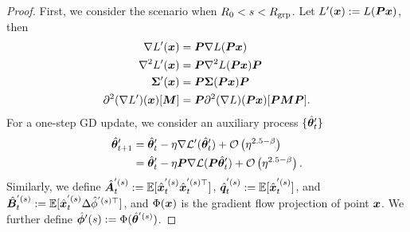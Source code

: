 \begin{proof}
    First, we consider the scenario when $R_0< s < R_{\mathrm{grp}}$. Let $L'({\bm{x}}) := L({\bm{P}} {\bm{x}})$, then 
    \begin{align*}
        \nabla L'({\bm{x}}) &= {\bm{P}} \nabla L({\bm{P}} {\bm{x}})\\
        \nabla^2 L'({\bm{x}}) &= {\bm{P}} \nabla^2 L({\bm{P}} {\bm{x}}) {\bm{P}}\\
        {\bm{\Sigma}}'({\bm{x}}) &= {\bm{P}} {\bm{\Sigma}}({\bm{P}}{\bm{x}}) {\bm{P}}\\
        \partial^2 (\nabla L')({\bm{x}}) [{\bm{M}}] &= {\bm{P}} \partial^2 (\nabla L)({\bm{P}} {\bm{x}})[{\bm{P}} {\bm{M}} {\bm{P}}].
    \end{align*}
    For a one-step GD update, we consider an auxiliary process $\{\hat{{\bm{\theta}}}'_t\}$
    \begin{align*}
        \hat{{\bm{\theta}}}'_{t+1} &= \hat{{\bm{\theta}}}'_t - \eta \nabla \mathcal{L}'(\hat{{\bm{\theta}}}'_t) + \mathcal{O}\left(\eta^{2.5-\beta}\right)\\
        &=\hat{{\bm{\theta}}}'_t - \eta {\bm{P}}\nabla \mathcal{L}({\bm{P}} \hat{{\bm{\theta}}}'_t) + \mathcal{O}\left(\eta^{2.5-\beta}\right).
    \end{align*}
    Similarly, we define \( \hat{{\bm{A}}}_t^{'(s)} := \mathbb{E}[\hat{{\bm{x}}}_t^{'(s)} \hat{{\bm{x}}}_t^{'(s)\top}] \), \( \hat{{\bm{q}}}_t^{'(s)} := \mathbb{E}[\hat{{\bm{x}}}_t^{'(s)}] \), and \( \hat{{\bm{B}}}_t^{'(s)} := \mathbb{E}[\hat{{\bm{x}}}_t^{'(s)} \Delta \hat\phi^{'(s)\top}] \), and \( \Phi({\bm{x}}) \) is the gradient flow projection of point \( {\bm{x}} \). We further define $\hat{{\bm{\phi}}}'(s):= \Phi(\hat{{\bm{\theta}}}^{'(s)})$. 


\end{proof}
